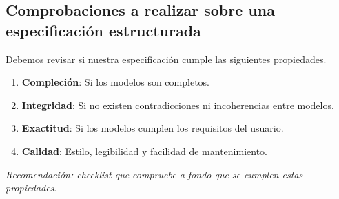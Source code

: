 

\subsection{Comprobaciones a realizar sobre una especificación estructurada}
Debemos revisar si nuestra especificación cumple las siguientes propiedades.
\begin{enumerate}
    \item \textbf{Compleción}: Si los modelos son completos.
    \item \textbf{Integridad}: Si no existen contradicciones ni incoherencias entre modelos.
    \item \textbf{Exactitud}: Si los modelos cumplen los requisitos del usuario.
    \item \textbf{Calidad}: Estilo, legibilidad y facilidad de mantenimiento.
\end{enumerate}
\textit{Recomendación: checklist que compruebe a fondo que se cumplen estas propiedades}.



